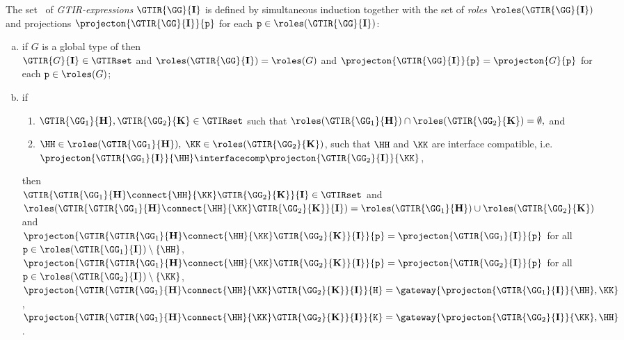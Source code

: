 \begin{definition}
\label{def:pre-gtir}
The set \GTIRset\ of {\em GTIR-expressions} $\GTIR{{\GG}}{\mathbf{I}}$ is defined by simultaneous induction together with
the set of {\em roles} $\roles(\GTIR{\GG}{\mathbf{I}})$
and projections $\projecton{\GTIR{{\GG}}{\mathbf{I}}}{{\tt p}}$ for each ${\tt p} \in \roles(\GTIR{\GG}{\mathbf{I}})$:

\begin{enumerate}[a)]

\item  if $G$ is a global type of \gt then\\
	 $\GTIR{G}{\mathbf{I}}\in \GTIRset$ and
$\roles(\GTIR{\GG}{\mathbf{I}}) = \roles(G)$ and 
$\projecton{\GTIR{{\GG}}{\mathbf{I}}}{{\tt p}} =
                  \projecton{G}{{\tt p}}$ 
                  for each ${\tt p}\in \roles({G})$;
	 
\item 	
	if
	\begin{enumerate}[1)]
	\item  $\GTIR{{\GG}_1}{\mathbf{H}}, \GTIR{{\GG}_2}{\mathbf{K}}\in\GTIRset$ such that
	$\roles(\GTIR{{\GG}_1}{\mathbf{H}}) \cap \roles(\GTIR{{\GG}_2}{\mathbf{K}})
	=\emptyset,$ and
	\item
	$\HH\in\roles(\GTIR{{\GG}_1}{\mathbf{H}}), \; \KK\in\roles(\GTIR{{\GG}_2}{\mathbf{K}})$,
	such that
	 $\HH$ and $\KK$ are interface compatible, i.e.\ $\projecton{\GTIR{{\GG_1}}{\mathbf{I}}}{\HH}\interfacecomp \projecton{\GTIR{{\GG_2}}{\mathbf{I}}}{\KK}$,
	\end{enumerate}
	then\\
	$\GTIR{\GTIR{{\GG}_1}{\mathbf{H}}\connect{\HH}{\KK}\GTIR{{\GG}_2}{\mathbf{K}}}{\mathbf{I}} \in \GTIRset$ 
	and
	$\roles(\GTIR{\GTIR{{\GG}_1}{\mathbf{H}}\connect{\HH}{\KK}\GTIR{{\GG}_2}{\mathbf{K}}}{\mathbf{I}}) = 
	\roles({\GTIR{{\GG}_1}{\mathbf{H}}}) \cup  \roles(\GTIR{{\GG}_2}{\mathbf{K}})$
and\\
 $\projecton{\GTIR{\GTIR{{\GG}_1}{\mathbf{H}}\connect{\HH}{\KK}\GTIR{{\GG}_2}{\mathbf{K}}}{\mathbf{I}}}{{\tt p}} = \projecton{\GTIR{{\GG}_1}{\mathbf{I}}}{{\tt p}}$
 for all ${\tt p}\in \roles(\GTIR{{\GG}_1}{\mathbf{I}})\setminus\{\HH\}$,\\
  $\projecton{\GTIR{\GTIR{{\GG}_1}{\mathbf{H}}\connect{\HH}{\KK}\GTIR{{\GG}_2}{\mathbf{K}}}{\mathbf{I}}}{{\tt p}} = \projecton{\GTIR{{\GG}_2}{\mathbf{I}}}{{\tt p}}$
 for all ${\tt p}\in \roles(\GTIR{{\GG}_2}{\mathbf{I}})\setminus\{\KK\}$,\\
   $\projecton{\GTIR{\GTIR{{\GG}_1}{\mathbf{H}}\connect{\HH}{\KK}\GTIR{{\GG}_2}{\mathbf{K}}}{\mathbf{I}}}{{\tt H}} = \gateway{\projecton{\GTIR{{\GG_1}}{\mathbf{I}}}{\HH},\KK}$,\\
   $\projecton{\GTIR{\GTIR{{\GG}_1}{\mathbf{H}}\connect{\HH}{\KK}\GTIR{{\GG}_2}{\mathbf{K}}}{\mathbf{I}}}{{\tt K}} = \gateway{\projecton{\GTIR{{\GG_2}}{\mathbf{I}}}{\KK},\HH}$.
\end{enumerate}

\end{definition}

